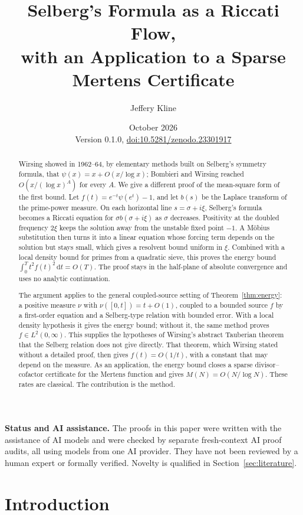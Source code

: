 \documentclass[11pt,letterpaper]{article}
\title{Selberg's Formula as a Riccati Flow,\\with an Application to a Sparse
Mertens Certificate}
\author{Jeffery Kline}
\date{October 2026\\[3pt]\small Version 0.1.0, \href{https://doi.org/10.5281/zenodo.23301917}{doi:10.5281/zenodo.23301917}}
\numberwithin{equation}{section}
\theoremstyle{definition}
\theoremstyle{remark}
\begin{document}
\maketitle
\begin{abstract}
Wirsing showed in 1962--64, by elementary methods built on Selberg's
symmetry formula, that $\psi(x)=x+O(x/\log x)$; Bombieri and Wirsing
reached $O(x/(\log x)^A)$ for every $A$. We give a different proof of the
mean-square form of the first bound. Let $f(t)=e^{-t}\psi(e^t)-1$, and let $b(s)$ be the Laplace
transform of the prime-power measure. On each horizontal line
$s=\sigma+i\xi$, Selberg's formula becomes a Riccati equation for
$\sigma b(\sigma+i\xi)$ as $\sigma$ decreases. Positivity at the doubled
frequency $2\xi$ keeps the solution away from the unstable fixed point $-1$.
A M\"obius substitution then turns it into a linear equation whose forcing
term depends on the solution but stays small, which gives a resolvent bound
uniform in $\xi$. Combined with a local density bound for
primes from a quadratic sieve, this proves the energy bound
$\int_0^T t^2f(t)^2\,\mathrm dt=O(T)$. The proof stays in the half-plane of
absolute convergence and uses no analytic continuation.

The argument applies to the general coupled-source setting of
Theorem~\ref{thm:energy}: a positive measure $\nu$ with $\nu([0,t])=t+O(1)$,
coupled to a bounded source $f$ by a first-order equation and a Selberg-type
relation with bounded error. With a local density hypothesis it gives the
energy bound; without it, the same method proves $f\in L^2(0,\infty)$. This
supplies the hypotheses of Wirsing's abstract Tauberian theorem that the
Selberg relation does not give directly. That theorem, which Wirsing stated
without a detailed proof, then gives $f(t)=O(1/t)$, with a constant that may
depend on the measure. As an application, the energy bound closes a sparse
divisor--cofactor certificate for the Mertens function and gives
$M(N)=O(N/\log N)$. These rates are classical. The contribution is the
method.
\end{abstract}

\noindent\textbf{Status and AI assistance.}
The proofs in this paper were written with the assistance of AI models and
were checked by separate fresh-context AI proof audits, all using models
from one AI provider. They have not been reviewed by a
human expert or formally verified. Novelty is qualified in
Section~\ref{sec:literature}.

\tableofcontents

\section{Introduction}\label{sec:overview}
\end{document}
